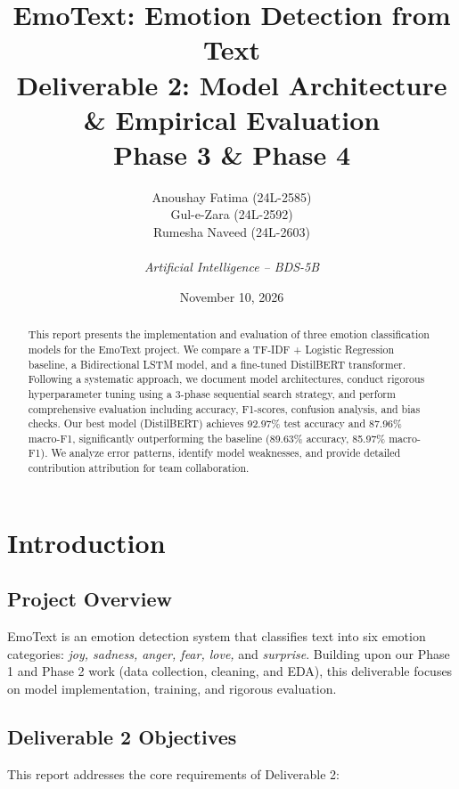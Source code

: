 \documentclass[12pt,a4paper]{article}
\title{\textbf{EmoText: Emotion Detection from Text}\\
\large Deliverable 2: Model Architecture \& Empirical Evaluation\\
\large Phase 3 \& Phase 4}
\author{
Anoushay Fatima (24L-2585) \\
Gul-e-Zara (24L-2592) \\
Rumesha Naveed (24L-2603) \\
\\
\textit{Artificial Intelligence -- BDS-5B}
}
\date{November 10, 2026}
\begin{document}
\maketitle

\begin{abstract}
This report presents the implementation and evaluation of three emotion classification models for the EmoText project. We compare a TF-IDF + Logistic Regression baseline, a Bidirectional LSTM model, and a fine-tuned DistilBERT transformer. Following a systematic approach, we document model architectures, conduct rigorous hyperparameter tuning using a 3-phase sequential search strategy, and perform comprehensive evaluation including accuracy, F1-scores, confusion analysis, and bias checks. Our best model (DistilBERT) achieves 92.97\% test accuracy and 87.96\% macro-F1, significantly outperforming the baseline (89.63\% accuracy, 85.97\% macro-F1). We analyze error patterns, identify model weaknesses, and provide detailed contribution attribution for team collaboration.
\end{abstract}

\newpage

\tableofcontents
\newpage

\section{Introduction}

\subsection{Project Overview}
EmoText is an emotion detection system that classifies text into six emotion categories: \textit{joy, sadness, anger, fear, love,} and \textit{surprise}. Building upon our Phase 1 and Phase 2 work (data collection, cleaning, and EDA), this deliverable focuses on model implementation, training, and rigorous evaluation.

\subsection{Deliverable 2 Objectives}
This report addresses the core requirements of Deliverable 2:
\end{document}
